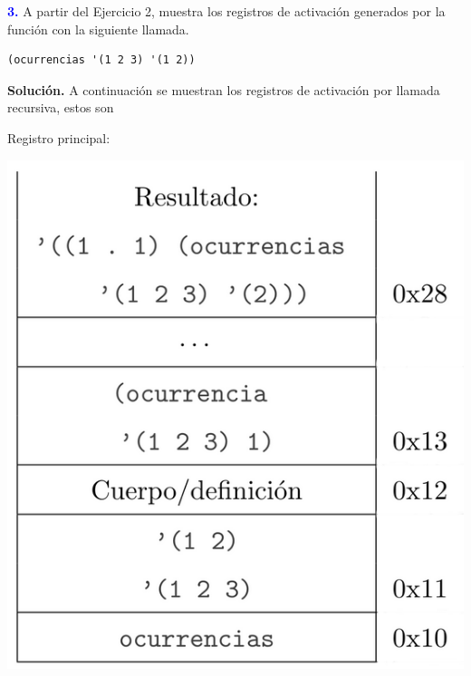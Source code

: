 \textbf{\textcolor{blue}{3.}} \Large
A partir del Ejercicio 2, muestra los registros de activación generados por la función con
la siguiente llamada.
\begin{lstlisting}
(ocurrencias '(1 2 3) '(1 2))
\end{lstlisting}

\textbf{Solución.} A continuación se muestran los registros
de activación por llamada recursiva, estos son \newline

Registro principal:
\begin{center}
        \includegraphics[scale=0.3]{./R1}
\end{center}


